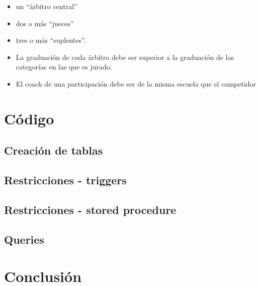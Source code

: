\documentclass[a4paper]{article}
\begin{document}
\begin{itemize}
\item un “árbitro central”

\item dos o más “jueces”

\item tres o más “suplentes”.

\item La graduación de cada árbitro debe ser superior a la graduación de las categorías en las que es jurado. 

\item El coach de una participación debe ser de la misma escuela que el competidor

\end{itemize}

\section{Código}

\subsection{Creación de tablas}



\subsection{Restricciones - triggers}



\subsection{Restricciones - stored procedure}



\subsection{Queries}



\section{Conclusión}

\newpage
\end{document}
